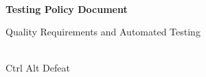 \begin{titlepage}
    \centering



    \vspace{2cm}
    \hrulefill\\
    \vspace{1cm}
    {\Huge\bfseries Testing Policy Document}

    \vspace{1cm}

    {\Large Quality Requirements and Automated Testing}\\
    \vspace{1cm}
    \hrulefill\\

    \vfill

    {\large Ctrl Alt Defeat}

    \vspace{1cm}


\end{titlepage}